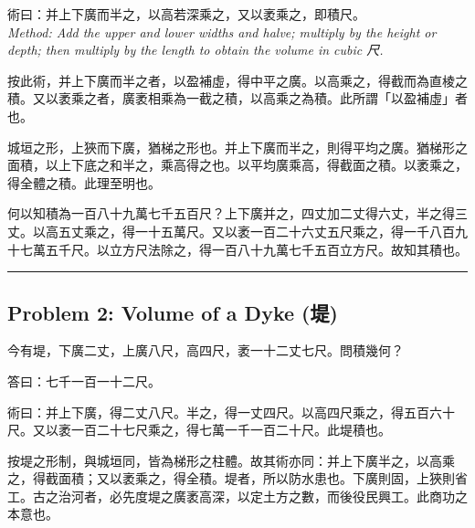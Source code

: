 \documentclass[11pt,a4paper]{article}
\newcommand{\zh}[1]{#1}
\newcommand{\longline}{\noindent\rule{\textwidth}{0.4pt}}
\begin{document}
\begin{method}[\zh{術}]
\zh{%
術曰：并上下廣而半之，以高若深乘之，又以袤乘之，即積尺。
}\\[0.3em]
\textit{Method: Add the upper and lower widths and halve; multiply by the height or depth; then multiply by the length to obtain the volume in cubic \zh{尺}.}
\end{method}

\begin{commentary}[\zh{劉徽注}]
\zh{%
按此術，并上下廣而半之者，以盈補虛，得中平之廣。以高乘之，得截而為直棱之積。又以袤乘之者，廣袤相乘為一截之積，以高乘之為積。此所謂「以盈補虛」者也。

城垣之形，上狹而下廣，猶梯之形也。并上下廣而半之，則得平均之廣。猶梯形之面積，以上下底之和半之，乘高得之也。以平均廣乘高，得截面之積。以袤乘之，得全體之積。此理至明也。

何以知積為一百八十九萬七千五百尺？上下廣并之，四丈加二丈得六丈，半之得三丈。以高五丈乘之，得一十五萬尺。又以袤一百二十六丈五尺乘之，得一千八百九十七萬五千尺。以立方尺法除之，得一百八十九萬七千五百立方尺。故知其積也。
}
\end{commentary}

\vspace{0.5cm}
\longline
\vspace{0.3cm}

\subsection{Problem 2: Volume of a Dyke (\zh{堤})}

\begin{problem}[\zh{堤第二} · Dyke]
\zh{%
今有堤，下廣二丈，上廣八尺，高四尺，袤一十二丈七尺。問積幾何？
}
\end{problem}

\begin{answer}[\zh{答}]
\zh{%
答曰：七千一百一十二尺。
}
\end{answer}

\begin{method}[\zh{術}]
\zh{%
術曰：并上下廣，得二丈八尺。半之，得一丈四尺。以高四尺乘之，得五百六十尺。又以袤一百二十七尺乘之，得七萬一千一百二十尺。此堤積也。
}
\end{method}

\begin{commentary}[\zh{劉徽注}]
\zh{%
按堤之形制，與城垣同，皆為梯形之柱體。故其術亦同：并上下廣半之，以高乘之，得截面積；又以袤乘之，得全積。堤者，所以防水患也。下廣則固，上狹則省工。古之治河者，必先度堤之廣袤高深，以定土方之數，而後役民興工。此商功之本意也。
}
\end{commentary}
\end{document}

